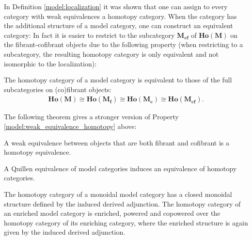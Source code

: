     In Definition \ref{model:localization} it was shown that one can assign to every category with weak equivalences a homotopy category. When the category has the additional structure of a model category, one can construct an equivalent category:
    In fact it is easier to restrict to the subcategory $\mathbf{M_{cf}}$ of $\mathbf{Ho(M)}$ on the fibrant-cofibrant objects due to the following property (when restricting to a subcategory, the resulting homotopy category is only equivalent and not isomorphic to the localization):
    \begin{property}
        The homotopy category of a model category is equivalent to those of the full subcategories on (co)fibrant objects:
        \begin{gather}
            \mathbf{Ho(M)}\cong\mathbf{Ho(M_f)}\cong\mathbf{Ho(M_c)}\cong\mathbf{Ho(M_{cf})}.
        \end{gather}
    \end{property}

    The following theorem gives a stronger version of Property \ref{model:weak_equivalence_homotopy} above:
    \begin{theorem}[Whitehead]
        A weak equivalence between objects that are both fibrant and cofibrant is a homotopy equivalence.
    \end{theorem}

    \begin{property}
        A Quillen equivalence of model categories induces an equivalence of homotopy categories.
    \end{property}

    \begin{property}
        The homotopy category of a monoidal model category has a closed monoidal structure defined by the induced derived adjunction. The homotopy category of an enriched model category is enriched, powered and copowered over the homotopy category of its enriching category, where the enriched structure is again given by the induced derived adjunction.
    \end{property}

